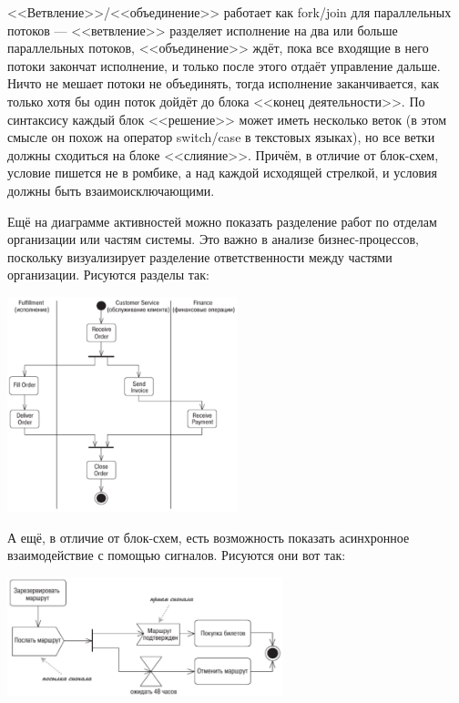 \documentclass{../../text-style}
\begin{document}
<<Ветвление>>/<<объединение>> работает как fork/join для параллельных потоков --- <<ветвление>> разделяет исполнение на два или больше параллельных потоков, <<объединение>> ждёт, пока все входящие в него потоки закончат исполнение, и только после этого отдаёт управление дальше. Ничто не мешает потоки не объединять, тогда исполнение заканчивается, как только хотя бы один поток дойдёт до блока <<конец деятельности>>. По синтаксису каждый блок <<решение>> может иметь несколько веток (в этом смысле он похож на оператор switch/case в текстовых языках), но все ветки должны сходиться на блоке <<слияние>>. Причём, в отличие от блок-схем, условие пишется не в ромбике, а над каждой исходящей стрелкой, и условия должны быть взаимоисключающими.

Ещё на диаграмме активностей можно показать разделение работ по отделам организации или частям системы. Это важно в анализе бизнес-процессов, поскольку визуализирует разделение ответственности между частями организации. Рисуются разделы так:

\begin{center}
    \includegraphics[width=0.5\textwidth]{activitySwimlanes.png}
\end{center}

А ещё, в отличие от блок-схем, есть возможность показать асинхронное взаимодействие с помощью сигналов. Рисуются они вот так:

\begin{center}
    \includegraphics[width=0.6\textwidth]{activitySignals.png}
\end{center}
\end{document}
